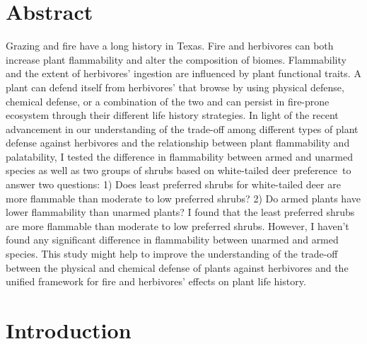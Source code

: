 \documentclass[12pt]{report}
\begin{document}
\section{Abstract}

Grazing and fire have a long history in Texas. Fire and herbivores can both increase plant flammability and alter the composition of biomes. Flammability and the extent of herbivores' ingestion are influenced by plant functional traits. A plant can defend itself from herbivores' that browse by using physical defense, chemical defense, or a combination of the two and can persist in fire-prone ecosystem through their different life history strategies. In light of the recent advancement in our understanding of the trade-off among different types of plant defense against herbivores and the relationship between plant flammability and palatability, I tested the difference in flammability between armed and unarmed species as well as two groups of shrubs based on white-tailed deer preference to answer two questions: 1) Does least preferred shrubs for white-tailed deer are more flammable than moderate to low preferred shrubs? 2) Do armed plants have lower flammability than unarmed plants? I found that the least preferred shrubs are more flammable than moderate to low preferred shrubs. However, I haven't found any significant difference in flammability between
unarmed and armed species. This study might help to improve the understanding of the trade-off between the physical and chemical defense of plants against herbivores and the unified framework for fire and herbivores' effects on plant life history. 


\section{Introduction}
\end{document}
